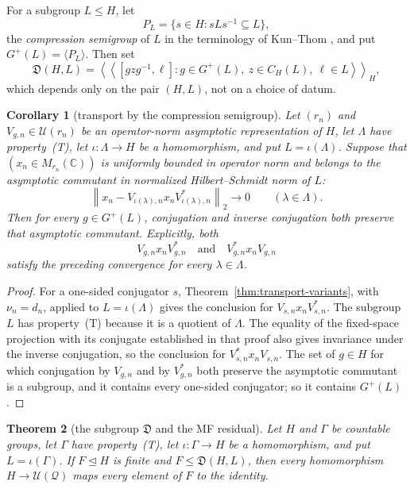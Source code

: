 \documentclass[11pt]{amsart}
\newcommand{\leanverified}[2]{\ignorespaces}
\newtheorem{theorem}{Theorem}[section]
\newtheorem{corollary}[theorem]{Corollary}
\theoremstyle{definition}
\theoremstyle{remark}
\theoremstyle{plain}
\newcommand{\C}{\mathbb C}
\newcommand{\U}{\mathcal U}
\newcommand{\hsnorm}[1]{\left\lVert #1\right\rVert_{2}}
\begin{document}
For a subgroup $L\le H$, let
\[
 P_L=\{s\in H:sLs^{-1}\subseteq L\},
\]
the \emph{compression semigroup} of $L$ in the terminology of
Kun--Thom \cite{KT}, and put $G^{+}(L)=\langle P_L\rangle$.  Then set
\begin{equation}\label{eq:intrinsicdefect}
 \mathfrak D(H,L)=
 \left\langle\!\left\langle
 [gzg^{-1},\ell]:g\in G^{+}(L),\ z\in C_H(L),\ \ell\in L
 \right\rangle\!\right\rangle_H,
\end{equation}
which depends only on the pair $(H,L)$, not on a choice of datum.

\begin{corollary}[transport by the compression semigroup]\label{cor:generaltransport}
Let $(r_n)$ and $V_{g,n}\in\U(r_n)$ be an operator-norm asymptotic
representation of $H$, let $\Lambda$ have property~\textup{(T)}, let
$\iota\colon\Lambda\to H$ be a homomorphism, and put $L=\iota(\Lambda)$.
Suppose that $(x_n\in M_{r_n}(\C))$ is uniformly bounded in operator norm
and belongs to the asymptotic commutant in normalized Hilbert--Schmidt norm of $L$:
\[
 \hsnorm{x_n-V_{\iota(\lambda),n}x_nV_{\iota(\lambda),n}^*}
 \longrightarrow0
 \qquad(\lambda\in\Lambda).
\]
Then for every $g\in G^{+}(L)$, conjugation and inverse conjugation
both preserve that asymptotic commutant.  Explicitly, both
\[
 V_{g,n}x_nV_{g,n}^*
 \quad\text{and}\quad
 V_{g,n}^*x_nV_{g,n}
\]
satisfy the preceding convergence for every $\lambda\in\Lambda$.
\leanverified{Sofic/DefectActionAnyUniverse}{GroupApproximation.KazhdanAsymptoticCommutant.compressionGroup_transport_both_anyUniverse}
\end{corollary}

\begin{proof}
For a one-sided conjugator $s$, Theorem~\ref{thm:transport-variants}, with
$\nu_n=d_n$, applied to $L=\iota(\Lambda)$ gives the conclusion for
$V_{s,n}x_nV_{s,n}^*$.  The subgroup $L$ has property~\textup{(T)}
because it is a quotient of $\Lambda$.  The equality of the
fixed-space projection with its conjugate established in that proof
also gives invariance under the inverse conjugation, so the
conclusion for $V_{s,n}^*x_nV_{s,n}$.  The set of $g\in H$ for which
conjugation by $V_{g,n}$ and by $V_{g,n}^*$ both preserve the
asymptotic commutant is a subgroup, and it contains every one-sided
conjugator; so it contains $G^{+}(L)$.
\end{proof}

\begin{theorem}[the subgroup $\mathfrak D$ and the MF residual]
\label{thm:compression-radical}
Let $H$ and $\Gamma$ be countable groups, let $\Gamma$ have
property~\textup{(T)}, let
$\iota\colon\Gamma\to H$ be a homomorphism, and put
$L=\iota(\Gamma)$.  If $F\trianglelefteq H$ is finite and
$F\le\mathfrak D(H,L)$, then every homomorphism $H\to\U(\mathcal Q)$ maps every element of $F$ to the identity.
\leanverified{Sofic/DefectRadicalAnyUniverse}{GroupApproximation.KazhdanAsymptoticCommutant.manuscriptCompressionRadical_anyUniverse}
\end{theorem}
\end{document}

